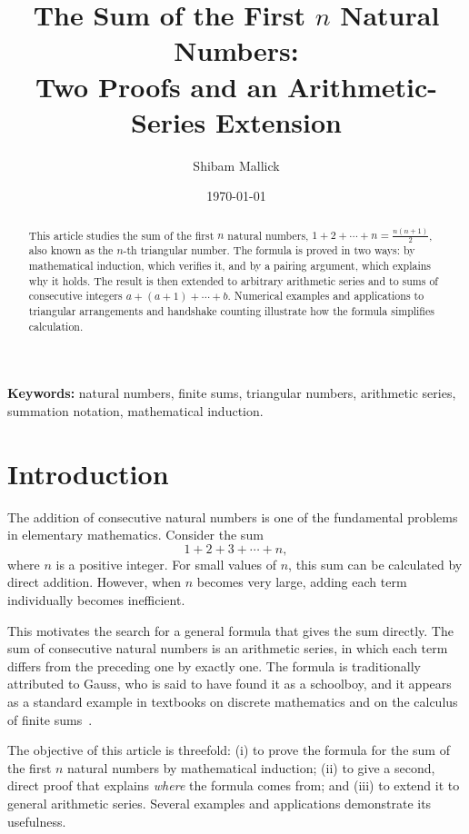 \documentclass[12pt,a4paper]{article}
\title{The Sum of the First $n$ Natural Numbers:\\ Two Proofs and an Arithmetic-Series Extension}
\author{Shibam Mallick}
\date{\today}
\theoremstyle{definition}
\begin{document}
\maketitle
 
\begin{abstract}
    This article studies the sum of the first \(n\) natural numbers, \(1+2+\cdots+n=\frac{n(n+1)}{2}\), also known as the \(n\)-th triangular number. The formula is proved in two ways: by mathematical induction, which verifies it, and by a pairing argument, which explains why it holds. The result is then extended to arbitrary arithmetic series and to sums of consecutive integers \(a+(a+1)+\cdots+b\). Numerical examples and applications to triangular arrangements and handshake counting illustrate how the formula simplifies calculation.
\end{abstract}
 
\noindent\textbf{Keywords:}
natural numbers, finite sums, triangular numbers, arithmetic series, summation notation, mathematical induction.
 
\section{Introduction}
 
The addition of consecutive natural numbers is one of the fundamental problems in elementary mathematics. Consider the sum \[1 + 2 + 3 + \cdots + n,\] where $n$ is a positive integer. For small values of $n$, this sum can be calculated by direct addition. However, when $n$ becomes very large, adding each term individually becomes inefficient.
 
This motivates the search for a general formula that gives the sum directly. The sum of consecutive natural numbers is an arithmetic series, in which each term differs from the preceding one by exactly one. The formula is traditionally attributed to Gauss, who is said to have found it as a schoolboy, and it appears as a standard example in textbooks on discrete mathematics and on the calculus of finite sums~\cite{rosen,graham}. %
 
The objective of this article is threefold: (i) to prove the formula for the sum of the first $n$ natural numbers by mathematical induction; (ii) to give a second, direct proof that explains \emph{where} the formula comes from; and (iii) to extend it to general arithmetic series. Several examples and applications demonstrate its usefulness.
 
\end{document}

